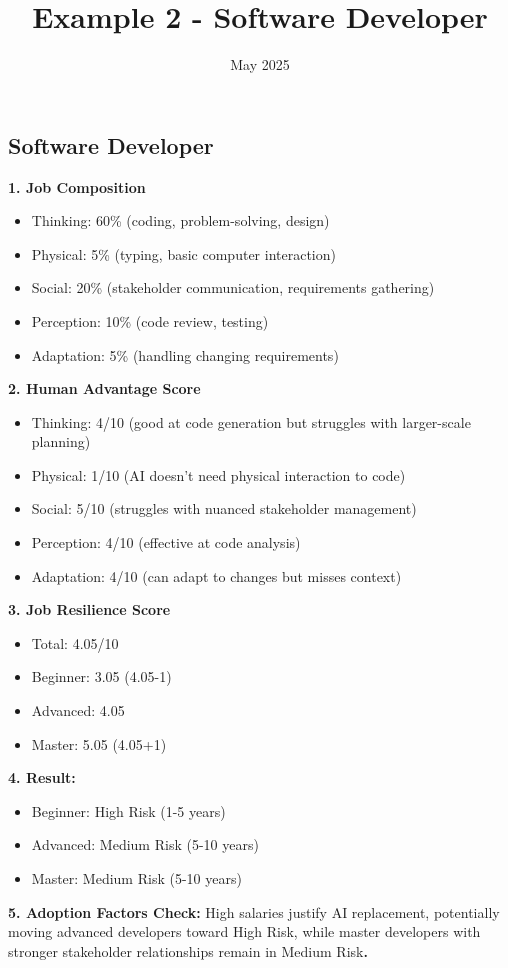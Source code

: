 \documentclass[
  11pt,
]{article}
\title{Example 2 - Software Developer}
\author{}
\date{May 2025}
\providecommand{\tightlist}{%
  \setlength{\itemsep}{0pt}\setlength{\parskip}{0pt}}
\begin{document}
\maketitle

\subsection{Software Developer}\label{software-developer}

\textbf{1. Job Composition}

\begin{itemize}
\tightlist
\item
  Thinking: 60\% (coding, problem-solving, design)
\item
  Physical: 5\% (typing, basic computer interaction)
\item
  Social: 20\% (stakeholder communication, requirements gathering)
\item
  Perception: 10\% (code review, testing)
\item
  Adaptation: 5\% (handling changing requirements)
\end{itemize}

\textbf{2. Human Advantage Score}

\begin{itemize}
\tightlist
\item
  Thinking: 4/10 (good at code generation but struggles with
  larger-scale planning)
\item
  Physical: 1/10 (AI doesn't need physical interaction to code)
\item
  Social: 5/10 (struggles with nuanced stakeholder management)
\item
  Perception: 4/10 (effective at code analysis)
\item
  Adaptation: 4/10 (can adapt to changes but misses context)
\end{itemize}

\textbf{3. Job Resilience Score}

\begin{itemize}
\tightlist
\item
  Total: 4.05/10
\item
  Beginner: 3.05 (4.05-1)
\item
  Advanced: 4.05
\item
  Master: 5.05 (4.05+1)
\end{itemize}

\textbf{4. Result:}

\begin{itemize}
\tightlist
\item
  Beginner: High Risk (1-5 years)
\item
  Advanced: Medium Risk (5-10 years)
\item
  Master: Medium Risk (5-10 years)
\end{itemize}

\textbf{5. Adoption Factors Check: }High salaries justify AI
replacement, potentially moving advanced developers toward High Risk,
while master developers with stronger stakeholder relationships remain
in Medium Risk\textbf{.}
\end{document}
